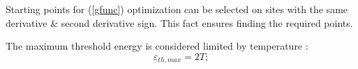 \documentclass[a0paper,portrait]{baposter}
\begin{document}
\begin{poster}
{        %
        Starting points for (\ref{gfunc}) optimization can be 
        selected on sites with the same derivative \& second derivative sign. This fact ensures 
        finding the required points.

        The maximum threshold energy is considered limited by temperature \cite{Rumyantsev:IOP:2018}:
        \begin{equation}
            \varepsilon_{th,max} = 2T;
        \end{equation}


    }




\end{poster}
\end{document}
